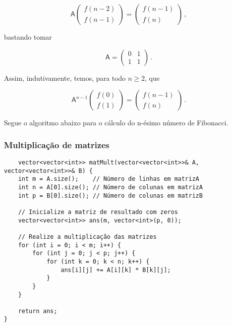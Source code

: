 \begin{equation*}
\mathsf A\begin{pmatrix}
f(n-2)\\
f(n-1)
\end{pmatrix}=
\begin{pmatrix}
f(n-1)\\
f(n)
\end{pmatrix}\,,
\end{equation*}

bastando tomar

\begin{equation*}
\mathsf A=\begin{pmatrix}
0 & 1\\
1 & 1
\end{pmatrix}\,.
\end{equation*}

Assim, indutivamente, temos, para todo $n\geq2$, que

\begin{equation*}
\label{eqfibm}
\mathsf A^{n-1}\begin{pmatrix}
f(0)\\
f(1)
\end{pmatrix}=
\begin{pmatrix}
f(n-1)\\
f(n)
\end{pmatrix}\,.
\end{equation*}

Segue o algoritmo abaixo para o cálculo do n-ésimo número de Fibonacci.

\subsubsection{Multiplicação de matrizes}

\begin{verbatim}    
    vector<vector<int>> matMult(vector<vector<int>>& A, vector<vector<int>>& B) {
    int m = A.size();    // Número de linhas em matrizA
    int n = A[0].size(); // Número de colunas em matrizA
    int p = B[0].size(); // Número de colunas em matrizB

    // Inicialize a matriz de resultado com zeros
    vector<vector<int>> ans(m, vector<int>(p, 0));

    // Realize a multiplicação das matrizes
    for (int i = 0; i < m; i++) {
        for (int j = 0; j < p; j++) {
            for (int k = 0; k < n; k++) {
                ans[i][j] += A[i][k] * B[k][j];
            }
        }
    }

    return ans;
}
\end{verbatim}


